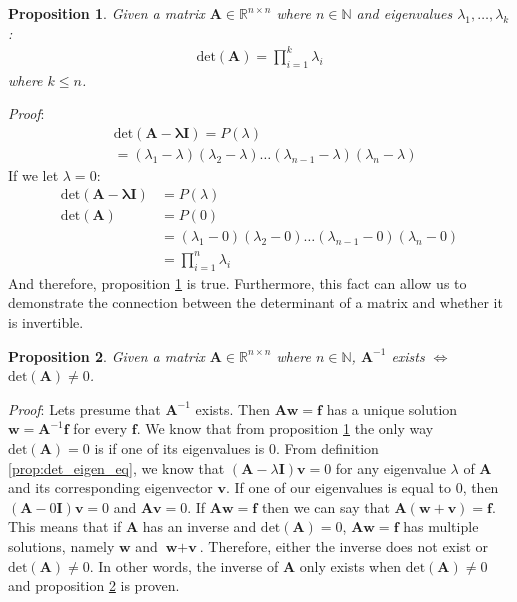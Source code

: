 \documentclass[a4paper,12pt]{book}
\newcommand{\matrx}[1]{\bm{#1}}
\newcommand{\vectr}[1]{\textbf{#1}}
\newcommand{\real}{\mathbb{R}}
\newcommand{\natral}{\mathbb{N}}
\newcommand{\italic}[1]{\textit{#1}}
\newcommand{\dett}[1]{\text{det}(\matrx{#1})}
\newtheorem{proposition}{Proposition}[section]
\begin{document}
	\begin{proposition}
		\normalfont Given a matrix $ \matrx{A} \in \real^{n \times n} $ where $ n \in \natral $ and eigenvalues $ \lambda_1,\ldots,\lambda_k $: 
		\begin{align}
			\dett{\matrx{A}} = \prod_{i = 1}^{k} \lambda_i
		\end{align}
		where $ k \leq n $. 
		\label{prop:det_prod_eigen}
	\end{proposition}
	\italic{Proof}: 
	\begin{align}
		&\dett{\matrx{A} - \lambda \matrx{I}} = P(\lambda) \\ 
		&= (\lambda_1 - \lambda)(\lambda_2 - \lambda)\ldots(\lambda_{n - 1} - \lambda)(\lambda_n - \lambda)
	\end{align}
	If we let $ \lambda = 0$:
	\begin{align}
		\dett{A - \lambda\matrx{I}} &= P(\lambda) \\
		\dett{A} &= P(0) \\
		&= (\lambda_1 - 0)(\lambda_2 - 0)\ldots(\lambda_{n - 1} - 0)(\lambda_n - 0) \\
		&= \prod_{i = 1}^{n} \lambda_i
	\end{align}
	And therefore, proposition \ref{prop:det_prod_eigen} is true. Furthermore, this fact can allow us to demonstrate the connection between the determinant of a matrix and whether it is invertible.
	\begin{proposition}
		\normalfont Given a matrix $ \matrx{A} \in \real^{n \times n} $ where $ n \in \natral $, $ \matrx{A}^{-1} $ exists $\iff$ $ \dett{A} \ne 0 $.
		\label{prop:det_eq_inv}
	\end{proposition}
	\italic{Proof}: Lets presume that $ \matrx{A}^{-1} $ exists. Then $ \matrx{A}\vectr{w} = \vectr{f} $ has a unique solution $ \vectr{w} = \matrx{A}^{-1}\vectr{f} $ for every $ \vectr{f} $.  We know that from proposition \ref{prop:det_prod_eigen} the only way $ \dett{A} = 0 $ is if one of its eigenvalues is $ 0 $. From definition \ref{prop:det_eigen_eq}, we know that $ (\matrx{A} - \lambda\matrx{I})\vectr{v} = 0 $ for any eigenvalue $ \lambda $ of $ \matrx{A} $ and its corresponding eigenvector $ \vectr{v} $. If one of our eigenvalues is equal to $ 0 $, then $ (\matrx{A} - 0\matrx{I})\vectr{v} = 0$ and $ \matrx{A}\vectr{v} = 0 $. If $ \matrx{A}\vectr{w} = \vectr{f} $ then we can say that $ \matrx{A}(\vectr{w} + \vectr{v}) = \vectr{f} $. This means that if $ \matrx{A} $ has an inverse and $ \dett{A} = 0 $, $ \matrx{A}\vectr{w} = \vectr{f} $ has multiple solutions, namely $ \vectr{w} $ and $ \vectr{w} + \vectr{v} $. Therefore, either the inverse does not exist or $ \dett{A} \ne 0 $. In other words, the inverse of $ \matrx{A} $ only exists when $ \dett{A} \ne 0$ and proposition \ref{prop:det_eq_inv} is proven. 
\end{document}
